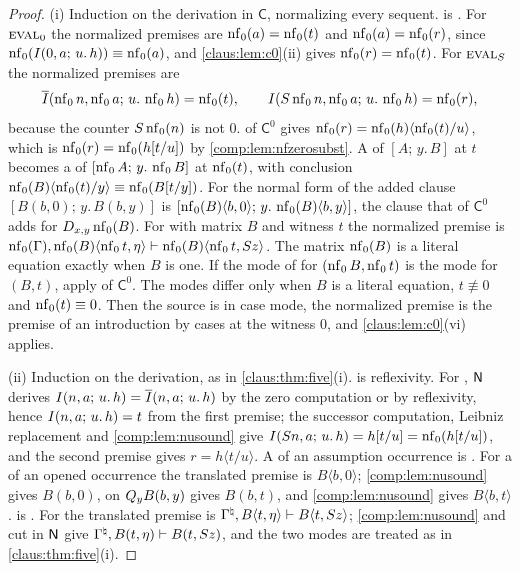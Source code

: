 \begin{proof}
(i) Induction on the derivation in $\mathsf{C}$, normalizing every sequent.
 is . For $\rulename{Eval}_0$ the normalized
premises are $\operatorname{nf}_0(a)=\operatorname{nf}_0(t)$ and $\operatorname{nf}_0(a)=\operatorname{nf}_0(r)$, since
$\operatorname{nf}_0(I(0,a;\,u.\,h))\equiv\operatorname{nf}_0(a)$, and \cref{claus:lem:c0}(ii) gives
$\operatorname{nf}_0(r)=\operatorname{nf}_0(t)$. For $\rulename{Eval}_{\Suc}$ the normalized premises are
\[
 \overline{I}(\operatorname{nf}_0 n,\operatorname{nf}_0 a;\,u.\,\operatorname{nf}_0 h)=\operatorname{nf}_0(t),\qquad
 I(S\operatorname{nf}_0 n,\operatorname{nf}_0 a;\,u.\,\operatorname{nf}_0 h)=\operatorname{nf}_0(r),
\]
because the counter $S\operatorname{nf}_0(n)$ is not $0$.  of
$\mathsf{C}^{0}$ gives $\operatorname{nf}_0(r)=\operatorname{nf}_0(h)\langle\operatorname{nf}_0(t)/u\rangle$, which is
$\operatorname{nf}_0(r)=\operatorname{nf}_0(h[t/u])$ by \cref{comp:lem:nfzerosubst}. A  of
$[A;\,y.\,B]$ at $t$ becomes a  of $[\operatorname{nf}_0 A;\,y.\,\operatorname{nf}_0 B]$ at
$\operatorname{nf}_0(t)$, with conclusion
$\operatorname{nf}_0(B)\langle\operatorname{nf}_0(t)/y\rangle\equiv\operatorname{nf}_0(B[t/y])$. For 
the normal form of the added clause $[B(b,0);\,y.\,B(b,y)]$ is
$[\operatorname{nf}_0(B)\langle b,0\rangle;\,y.\,\operatorname{nf}_0(B)\langle b,y\rangle]$, the clause that
 of $\mathsf{C}^{0}$ adds for $D_{x,y}\operatorname{nf}_0(B)$. For
 with matrix $B$ and witness $t$ the normalized premise is
$\operatorname{nf}_0(\Gamma),\operatorname{nf}_0(B)\langle\operatorname{nf}_0 t,\eta\rangle\vdash
\operatorname{nf}_0(B)\langle\operatorname{nf}_0 t,S z\rangle$. The matrix $\operatorname{nf}_0(B)$ is a literal
equation exactly when $B$ is one. If the mode of  for
$(\operatorname{nf}_0 B,\operatorname{nf}_0 t)$ is the mode for $(B,t)$, apply  of
$\mathsf{C}^{0}$. The modes differ only when $B$ is a literal equation,
$t\not\equiv 0$ and $\operatorname{nf}_0(t)\equiv 0$. Then the source is in case mode, the
normalized premise is the premise of an introduction by cases at the
witness $0$, and \cref{claus:lem:c0}(vi) applies.

(ii) Induction on the derivation, as in \cref{claus:thm:five}(i).
 is reflexivity. For , $\mathsf{N}$ derives
$I(n,a;\,u.\,h)=\overline{I}(n,a;\,u.\,h)$ by the zero computation or by
reflexivity, hence $I(n,a;\,u.\,h)=t$ from the first premise; the
successor computation, Leibniz replacement and \cref{comp:lem:nusound} give
$I(S n,a;\,u.\,h)=h[t/u]=\operatorname{nf}_0(h[t/u])$, and the second
premise gives $r=h\langle t/u\rangle$. A  of an assumption
occurrence is . For a  of an opened occurrence the
translated premise is $B\langle b,0\rangle$; \cref{comp:lem:nusound} gives
$B(b,0)$,  on $Q_{y}B(b,y)$ gives $B(b,t)$, and \cref{comp:lem:nusound}
gives $B\langle b,t\rangle$.  is . For 
the translated premise is
$\Gamma^{\natural},B\langle t,\eta\rangle\vdash B\langle t,S z\rangle$;
\cref{comp:lem:nusound} and cut in $\mathsf{N}$ give
$\Gamma^{\natural},B(t,\eta)\vdash B(t,S z)$, and the two modes are
treated as in \cref{claus:thm:five}(i).


\end{proof}

